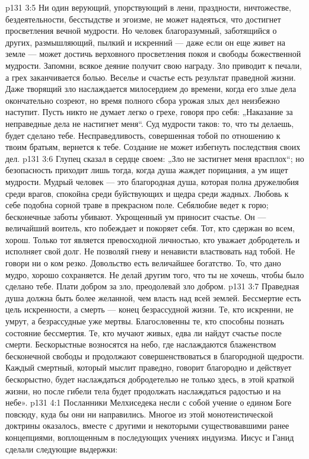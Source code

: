 \vs p131 3:5 Ни один верующий, упорствующий в лени, праздности, ничтожестве, бездеятельности, бесстыдстве и эгоизме, не может надеяться, что достигнет просветления вечной мудрости. Но человек благоразумный, заботящийся о других, размышляющий, пылкий и искренний --- даже если он еще живет на земле --- может достичь верховного просветления покоя и свободы божественной мудрости. Запомни, всякое деяние получит свою награду. Зло приводит к печали, а грех заканчивается болью. Веселье и счастье есть результат праведной жизни. Даже творящий зло наслаждается милосердием до времени, когда его злые дела окончательно созреют, но время полного сбора урожая злых дел неизбежно наступит. Пусть никто не думает легко о грехе, говоря про себя: „Наказание за неправедные дела не настигнет меня“. Суд мудрости таков: то, что ты делаешь, будет сделано тебе. Несправедливость, совершенная тобой по отношению к твоим братьям, вернется к тебе. Создание не может избегнуть последствия своих дел.
\vs p131 3:6 Глупец сказал в сердце своем: „Зло не застигнет меня врасплох“; но безопасность приходит лишь тогда, когда душа жаждет порицания, а ум ищет мудрости. Мудрый человек --- это благородная душа, которая полна дружелюбия среди врагов, спокойна среди буйствующих и щедра среди жадных. Любовь к себе подобна сорной траве в прекрасном поле. Себялюбие ведет к горю; бесконечные заботы убивают. Укрощенный ум приносит счастье. Он --- величайший воитель, кто побеждает и покоряет себя. Тот, кто сдержан во всем, хорош. Только тот является превосходной личностью, кто уважает добродетель и исполняет свой долг. Не позволяй гневу и ненависти властвовать над тобой. Не говори ни о ком резко. Довольство есть величайшее богатство. То, что дано мудро, хорошо сохраняется. Не делай другим того, что ты не хочешь, чтобы было сделано тебе. Плати добром за зло, преодолевай зло добром.
\vs p131 3:7 Праведная душа должна быть более желанной, чем власть над всей землей. Бессмертие есть цель искренности, а смерть --- конец безрассудной жизни. Те, кто искренни, не умрут, а безрассудные уже мертвы. Благословенны те, кто способны познать состояние бессмертия. Те, кто мучают живых, едва ли найдут счастье после смерти. Бескорыстные возносятся на небо, где наслаждаются блаженством бесконечной свободы и продолжают совершенствоваться в благородной щедрости. Каждый смертный, который мыслит праведно, говорит благородно и действует бескорыстно, будет наслаждаться добродетелью не только здесь, в этой краткой жизни, но после гибели тела будет продолжать наслаждаться радостью и на небе».
\vs p131 4:1 Посланники Мелхиседека несли с собой учение о едином Боге повсюду, куда бы они ни направились. Многое из этой монотеистической доктрины оказалось, вместе с другими и некоторыми существовавшими ранее концепциями, воплощенным в последующих учениях индуизма. Иисус и Ганид сделали следующие выдержки:
